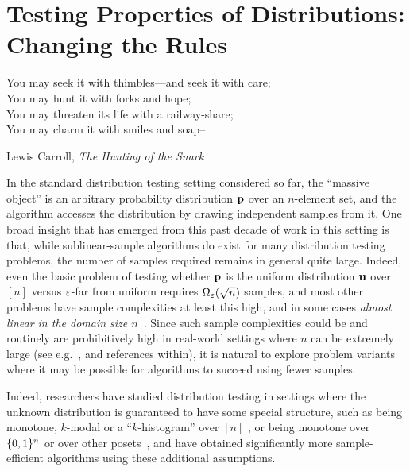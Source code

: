 \chapter{Testing Properties of Distributions: Changing the Rules}\label{chap:newmodels}

\epigraph{You may seek it with thimbles—and seek it with care;\\
   You may hunt it with forks and hope;\\
You may threaten its life with a railway-share;\\
   You may charm it with smiles and soap--}{Lewis Carroll, \textit{The Hunting of the Snark}}
   

In the standard distribution testing setting considered so far, the ``massive object'' is an arbitrary probability distribution $\mathbf{p}$ over an $n$-element set, and the algorithm accesses the distribution by drawing independent samples from it. One broad insight that has emerged from this past decade of work in this setting is that, while sublinear-sample algorithms do exist for many distribution testing problems, the number of samples required remains in general quite large.  Indeed, even the basic problem of testing whether $\mathbf{p}$ is the uniform distribution $\mathbf{u}$ over $[n]$ versus $\varepsilon$-far from uniform requires $\Omega_\varepsilon(\sqrt{n})$ samples, and most other problems have sample complexities at least this high, and in some cases \emph{almost linear in the domain size $n$}~\cite{RRSS:09,Valiant:11,ValiantValiant:11}. Since such sample complexities could be and routinely are prohibitively high in real-world settings where $n$ can be extremely large (see e.g.~\cite{BFRSW:00,GRexp:00,Ma:81:Physics,Rubinfeld:12:Survey}, and references within), it is natural to explore problem variants  where it may be possible for algorithms to succeed using fewer samples.  

Indeed, researchers have studied distribution testing in settings where the unknown distribution is guaranteed to have some special structure, such as being monotone, $k$-modal or a \mbox{``$k$-histogram''} over $[n]$ \cite{BKR:04,DDSVV:13,ILR:12}, or being monotone over $\{0,1\}^n$ \cite{RS:09} or over other posets~\cite{BFRV:11}, and have obtained significantly more sample-efficient algorithms using these additional assumptions.

